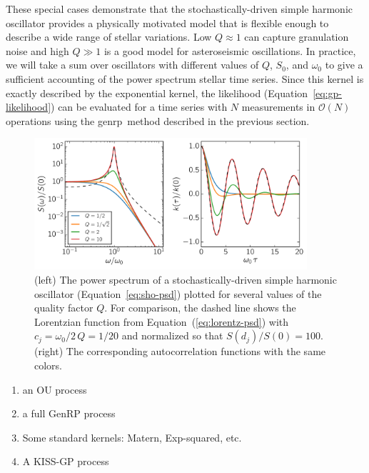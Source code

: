 \documentclass[manuscript, letterpaper]{aastex6}
\makeatletter
\let\origsection\section
\renewcommand\section{\@ifstar{\starsection}{\nostarsection}}
\newcommand\nostarsection[1]{\sectionprelude\origsection{#1}}
\newcommand\starsection[1]{\sectionprelude\origsection*{#1}}
\newcommand\sectionprelude{\vspace{1em}}
\let\origsubsection\subsection
\renewcommand\subsection{\@ifstar{\starsubsection}{\nostarsubsection}}
\newcommand\nostarsubsection[1]{\subsectionprelude\origsubsection{#1}}
\newcommand\starsubsection[1]{\subsectionprelude\origsubsection*{#1}}
\newcommand\subsectionprelude{\vspace{1em}}
\newcommand{\project}[1]{\textsf{#1}}
\newcommand{\genrp}{\project{genrp}}
\newcommand{\figurelabel}[1]{\label{fig:#1}}
\renewcommand{\eqref}[1]{\ref{eq:#1}}
\newcommand{\Eq}[1]{Equation~(\eqref{#1})}
\newcommand{\eq}[1]{\Eq{#1}}
\newcommand{\eqalt}[1]{Equation~\eqref{#1}}
\makeatother
\begin{document}
These special cases demonstrate that the stochastically-driven simple harmonic
oscillator provides a physically motivated model that is flexible enough to
describe a wide range of stellar variations.
Low $Q \approx 1$ can capture granulation noise and high $Q \gg 1$ is a good
model for asteroseismic oscillations.
In practice, we will take a sum over oscillators with different values of $Q$,
$S_0$, and $\omega_0$ to give a sufficient accounting of the power spectrum
stellar time series.
Since this kernel is exactly described by the exponential kernel, the
likelihood (\eqalt{gp-likelihood}) can be evaluated for a time series with $N$
measurements in $\mathcal{O}(N)$ operations using the \genrp\ method described
in the previous section.

\begin{figure}[!htbp]
\begin{center}
\includegraphics[width=0.9\textwidth]{figures/sho.pdf}
\caption{(left) The power spectrum of a stochastically-driven simple harmonic
    oscillator (\eqalt{sho-psd}) plotted for several values of the quality
    factor $Q$.
    For comparison, the dashed line shows the Lorentzian function from
    \eq{lorentz-psd} with $c_j = \omega_0/2\,Q = 1/20$ and normalized so that
    $S(d_j)/S(0) = 100$.
    (right) The corresponding autocorrelation functions with the same colors.
    \figurelabel{sho}}
\end{center}
\end{figure}


\section{Examples}

\subsection{Simulated data}

\begin{enumerate}
\item an OU process
\item a full GenRP process
\item Some standard kernels: Matern, Exp-squared, etc.
\item A KISS-GP process
\end{enumerate}
\end{document}
